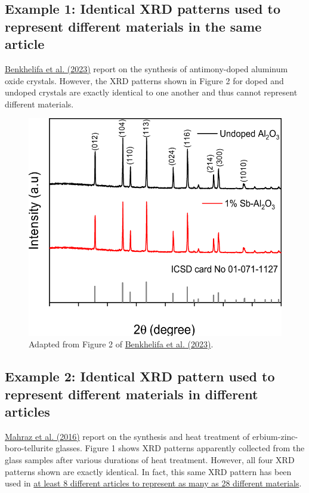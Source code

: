 \documentclass[letterpaper, 12pt]{article}
\begin{document}
\subsection*{Example 1: Identical XRD patterns used to represent different materials in the same article}

\href{https://doi.org/10.1007/s10971-023-06078-x}{Benkhelifa et al. (2023)} report on the synthesis of antimony-doped aluminum oxide crystals. However, the XRD patterns shown in Figure 2 for doped and undoped crystals are exactly identical to one another and thus cannot represent different materials.

\begin{figure}[h!tbp]
    \centering
    \includegraphics[width=\textwidth]{img/xrd_data_duplication/benkhelifa_figure_2.png}
    \caption*{Adapted from Figure 2 of \href{https://doi.org/10.1007/s10971-023-06078-x}{Benkhelifa et al. (2023)}.}
\end{figure}

\pagebreak

\subsection*{Example 2: Identical XRD pattern used to represent different materials in different articles}

\href{https://doi.org/10.1016/j.jlumin.2016.07.051}{Mahraz et al. (2016)} report on the synthesis and heat treatment of erbium-zinc-boro-tellurite glasses. Figure 1 shows XRD patterns apparently collected from the glass samples after various durations of heat treatment. However, all four XRD patterns shown are exactly identical. In fact, this same XRD pattern has been used in \href{https://pubpeer.com/publications/27A40862805C08DD269520435EAC67\#1}{at least 8 different articles to represent as many as 28 different materials}.
\end{document}
